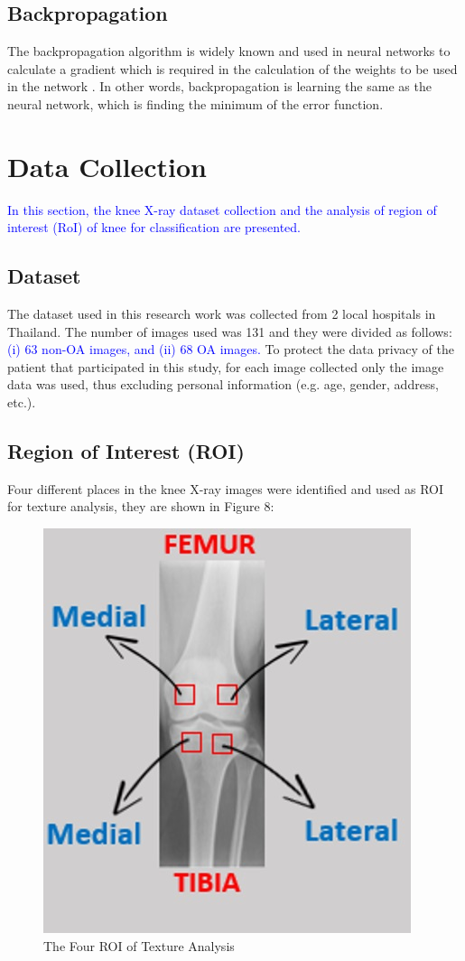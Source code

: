 \documentclass[review]{elsarticle}
\begin{document}
\subsection{Backpropagation}
\label{subsec:Back}
The backpropagation algorithm is widely known and used in neural networks to calculate a gradient which is required in the calculation of the weights to be used in the network \cite{Kelley1960}. In other words, backpropagation is learning the same as the neural network, which is finding the minimum of the error function.

\section{Data Collection}
\textcolor{blue}{
In this section, the knee X-ray dataset collection and the analysis of region of interest (RoI) of knee for classification are presented.
}
\subsection{Dataset}

The dataset used in this research work was collected from 2 local hospitals in Thailand. The number of images used was 131 and they were divided as follows:\textcolor{blue}{ (i) 63 non-OA images, and (ii) 68 OA images.} To protect the data privacy of the patient that participated in this study, for each image collected only the image data was used, thus excluding personal information (e.g. age, gender, address, etc.).

\subsection{Region of Interest (ROI)}

Four different places in the knee X-ray images were identified and used as ROI for texture analysis, they are shown in Figure 8: \\

\begin{figure}[h]
	\centering
	\includegraphics[width=0.5\linewidth]{pic/fig9}
	\caption{The Four ROI of Texture Analysis}
	\label{fig:fig9}
\end{figure}
\end{document}

